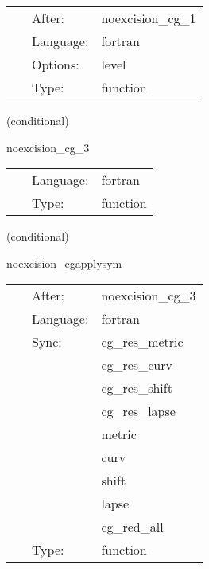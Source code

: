  \begin{tabular*}{160mm}{cll} 
~ & After:  & noexcision\_cg\_1 \\ 
~ & Language:  & fortran \\ 
~ & Options:  & level \\ 
~ & Type:  & function \\ 
\end{tabular*} 


\vspace{5mm}

   (conditional) 

\hspace{5mm} noexcision\_cg\_3 

\hspace{5mm}{\it conjugate gradients step 3 } 


\hspace{5mm}

 \begin{tabular*}{160mm}{cll} 
~ & Language:  & fortran \\ 
~ & Type:  & function \\ 
\end{tabular*} 


\vspace{5mm}

   (conditional) 

\hspace{5mm} noexcision\_cgapplysym 

\hspace{5mm}{\it select variables for boundary conditions 3 } 


\hspace{5mm}

 \begin{tabular*}{160mm}{cll} 
~ & After:  & noexcision\_cg\_3 \\ 
~ & Language:  & fortran \\ 
~ & Sync:  & cg\_res\_metric \\ 
~& ~ &cg\_res\_curv\\ 
~& ~ &cg\_res\_shift\\ 
~& ~ &cg\_res\_lapse\\ 
~& ~ &metric\\ 
~& ~ &curv\\ 
~& ~ &shift\\ 
~& ~ &lapse\\ 
~& ~ &cg\_red\_all\\ 
~ & Type:  & function \\ 
\end{tabular*} 


